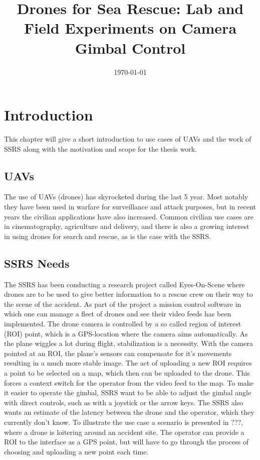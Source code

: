\documentclass[nofilelist]{cslthse-msc}
\title{Drones for Sea Rescue: Lab and Field Experiments on Camera Gimbal Control}
\date{\today}
\begin{document}
\renewcommand{\bibname}{References}

\makefrontmatter
\chapter{Introduction}
This chapter will give a short introduction to use cases of UAVs and the work of SSRS along with the motivation and scope for the thesis work.

\section{UAVs}
The use of UAVs (drones) has skyrocketed during the last 5 year. Most notably they have been used in warfare for surveillance and attack purposes, but in recent years the civilian applications have also increased. Common civilian use cases are in cinematography, agriculture and delivery, and there is also a growing interest in using drones for search and rescue, as is the case with the SSRS. 


\section{SSRS Needs}
The SSRS has been conducting a research project called Eyes-On-Scene where drones are to be used to give better information to a rescue crew on their way to the scene of the accident. As part of the project a mission control software in which one can manage a fleet of drones and see their video feeds has been implemented. The drone camera is controlled by a so called region of interest (ROI) point, which is a GPS-location where the camera aims automatically. As the plane wiggles a lot during flight, stabilization is a necessity. With the camera pointed at an ROI, the plane's sensors can compensate for it's movements resulting in a much more stable image.
The act of uploading a new ROI requires a point to be selected on a map, which then can be uploaded to the drone. This forces a context switch for the operator from the video feed to the map. To make it easier to operate the gimbal, SSRS want to be able to adjust the gimbal angle with direct controls, such as with a joystick or the arrow keys. The SSRS also wants an estimate of the latency between the drone and the operator, which they currently don't know.
To illustrate the use case a scenario is presented in ???, where a drone is loitering around an accident site. The operator can provide a ROI to the interface as a GPS point, but will have to go through the process of choosing and uploading a new point each time.
\end{document}
